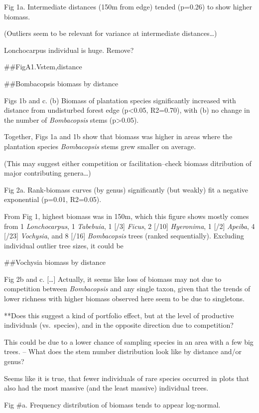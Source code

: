 \documentclass[]{article}
\begin{document}
Fig 1a. Intermediate distances (150m from edge) tended (p=0.26) to show
higher biomass.

(Outliers seem to be relevant for variance at intermediate
distances\ldots{})

Lonchocarpus individual is huge. Remove?

\#\#FigA1.Vstem,distance

\#\#Bombacopsis biomass by distance

Figs 1b and c. (b) Biomass of plantation species significantly increased
with distance from undisturbed forest edge (p\textless{}0.05, R2=0.70),
with (b) no change in the number of \emph{Bombacopsis} stems
(p\textgreater{}0.05).

Together, Figs 1a and 1b show that biomass was higher in areas where the
plantation species \emph{Bombacopsis} stems grew smaller on average.

(This may suggest either competition or facilitation--check biomass
ditribution of major contributing genera\ldots{})

Fig 2a. Rank-biomass curves (by genus) significantly (but weakly) fit a
negative exponential (p=0.01, R2=0.05).

From Fig 1, highest biomass was in 150m, which this figure shows mostly
comes from 1 \emph{Lonchocarpus}, 1 \emph{Tabebuia}, 1 {[}/3{]}
\emph{Ficus}, 2 {[}/10{]} \emph{Hyeronima}, 1 {[}/2{]} \emph{Apeiba}, 4
{[}/23{]} \emph{Vochysia}, and 8 {[}/16{]} \emph{Bombacopsis} trees
(ranked sequentially). Excluding individual outlier tree sizes, it could
be

\#\#Vochysia biomass by distance

Fig 2b and c. {[}\ldots{}{]} Actually, it seems like loss of biomass may
not due to competition between \emph{Bombacopsis} and any single taxon,
given that the trends of lower richness with higher biomass observed
here seem to be due to singletons.

**Does this suggest a kind of portfolio effect, but at the level of
productive individuals (vs.~species), and in the opposite direction due
to competition?

This could be due to a lower chance of sampling species in an area with
a few big trees. -- What does the stem number distribution look like by
distance and/or genus?

Seems like it is true, that fewer individuals of rare species occurred
in plots that also had the most massive (and the least massive)
individual trees.

Fig \#a. Frequency distribution of biomass tends to appear log-normal.
\end{document}
